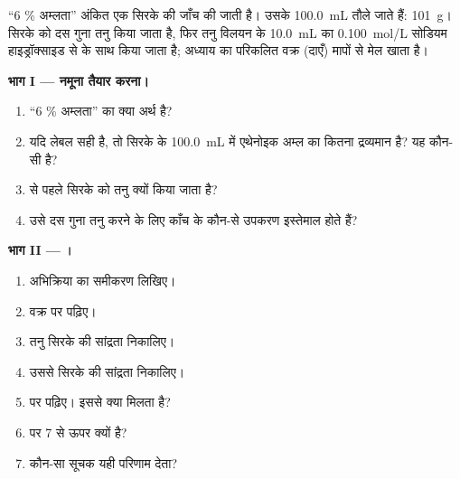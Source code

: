 \begin{problem}[{सप्ताहांत समस्या --- क्या ``6 \% अम्लता'' अंकित सिरके में
वास्तव में प्रति सौ ग्राम छह ग्राम एथेनोइक अम्ल है?}]
\label{pb:g12:ph-conductivity-titrations:1}
``6 \% अम्लता'' अंकित एक सिरके की जाँच की जाती है। उसके \qty{100.0}{mL}
तौले जाते हैं: \qty{101}{g}। सिरके को दस गुना तनु किया जाता है, फिर
तनु विलयन के \qty{10.0}{mL} का \qty{0.100}{mol/L} सोडियम हाइड्रॉक्साइड से
 के साथ  किया जाता है; अध्याय का परिकलित वक्र
(दाएँ) मापों से मेल खाता है।

\medskip
\noindent\textbf{भाग I --- नमूना तैयार करना।}
\begin{enumerate}
  \item ``6 \% अम्लता'' का क्या अर्थ है?
  \item यदि लेबल सही है, तो सिरके के \qty{100.0}{mL} में एथेनोइक अम्ल का कितना
        द्रव्यमान है? यह कौन-सी 
        है?
  \item {} से पहले सिरके को तनु क्यों किया जाता है?
  \item उसे दस गुना तनु करने के लिए काँच के कौन-से उपकरण इस्तेमाल होते हैं?
\end{enumerate}

\medskip
\noindent\textbf{भाग II --- ।}
\begin{enumerate}[resume]
  \item {} अभिक्रिया का समीकरण लिखिए।
  \item वक्र पर  पढ़िए।
  \item तनु सिरके की सांद्रता निकालिए।
  \item उससे सिरके की सांद्रता निकालिए।
  \item {} पर  पढ़िए। इससे क्या मिलता है?
  \item {} पर  7 से ऊपर क्यों है?
  \item कौन-सा सूचक यही परिणाम देता?
\end{enumerate}


\end{problem}
